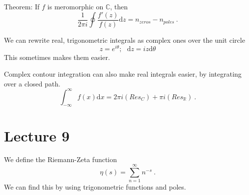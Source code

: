 \documentclass[11pt, a4paper]{article}
\begin{document}
Theorem: If $f$ is meromorphic on $\mathbb{C}$, then
$$
	\frac{1}{2\pi i} \oint \frac{f'(z)}{f(z)}\mathrm{d}z = n_{zeros} - n_{poles}~.
$$

We can rewrite real, trigonometric integrals as complex ones over the unit circle
$$
	z = e^{i\theta}; ~ ~ ~ \mathrm{d}z = iz\mathrm{d}\theta 
$$
This sometimes makes them easier.

Complex contour integration can also make real integrals easier, by integrating over a closed path.
$$
	\int^\infty_{-\infty} f(x)\mathrm{d}x = 2\pi i (Res_C) + \pi i (Res_\mathbb{R})~.
$$

\section{Lecture 9}

We define the Riemann-Zeta function
$$
	\eta(s) = \sum^\infty_{n=1} n^{-s}~.
$$
We can find this by using trigonometric functions and poles.
\end{document}
